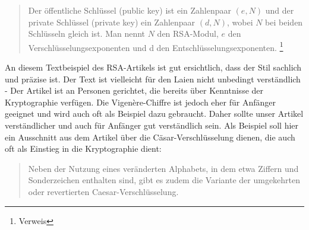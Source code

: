 \documentclass[11pt,paper=a4,final]{scrartcl}
\begin{document}
\begin{quote}
Der öffentliche Schlüssel (public key) ist ein Zahlenpaar \((e,N)\) und
der private Schlüssel (private key) ein Zahlenpaar \((d,N)\), wobei \(N\) bei
beiden Schlüsseln gleich ist. Man nennt \(N\) den RSA-Modul, \(e\) den
Verschlüsselungsexponenten und d den Entschlüsselungsexponenten.
\footnote{Verweis} %
\end{quote}

An diesem Textbeispiel des RSA-Artikels ist gut ersichtlich, dass der Stil
sachlich und pr\"azise ist. Der Text ist vielleicht f\"ur den Laien nicht
unbedingt verst\"andlich - Der Artikel ist an Personen gerichtet, die bereits
\"uber Kenntnisse der Kryptographie verf\"ugen. Die Vigen\`ere-Chiffre ist
jedoch eher f\"ur Anf\"anger geeignet und wird auch oft als Beispiel dazu
gebraucht. Daher sollte unser Artikel verst\"andlicher und auch f\"ur Anf\"anger
gut verst\"andlich sein. Als Beispiel soll hier ein Ausschnitt aus dem Artikel
\"uber die C\"asar-Verschl\"usselung dienen, die auch oft als Einstieg in die
Kryptographie dient:

\begin{quote}
Neben der Nutzung eines veränderten Alphabets, in dem etwa Ziffern und
Sonderzeichen enthalten sind, gibt es zudem die Variante der umgekehrten oder
revertierten Caesar-Verschlüsselung.
\end{quote}
{}

\end{document}
